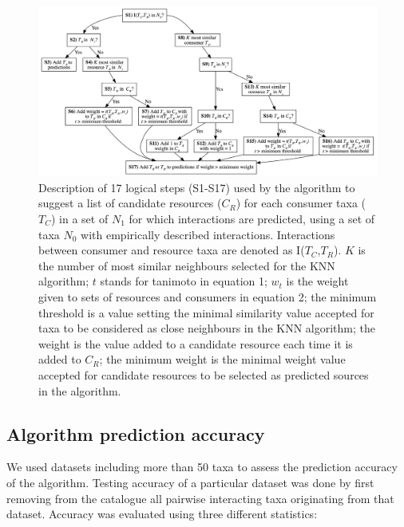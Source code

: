 \begin{figure}[H]
  \centering\includegraphics[width=\textwidth]{./figures/ch2-Decision_Diagram.png}
  \caption{Description of 17 logical steps (S1-S17) used by the algorithm to suggest a list of candidate resources ($C_R$) for each consumer taxa ($T_C$) in a set of $N_1$ for which interactions are predicted, using a set of taxa $N_0$ with empirically described interactions. Interactions between consumer and resource taxa are denoted as I($T_C$,$T_R$). $K$ is the number of most similar neighbours selected for the KNN algorithm; $t$ stands for tanimoto in equation 1; $w_t$ is the weight given to sets of resources and consumers in equation 2; the minimum threshold is a value setting the minimal similarity value accepted for taxa to be considered as close neighbours in the KNN algorithm; the weight is the value added to a candidate resource each time it is added to $C_R$; the minimum weight is the minimal weight value accepted for candidate resources to be selected as predicted sources in the algorithm.}
  \label{fig:decision_diag}
\end{figure}


\subsection{Algorithm prediction accuracy}
We used datasets including more than 50 taxa \citep{christian1999, link2002, thompson2004, brose2005, barnes2008, kortsch2015} to assess the prediction accuracy of the algorithm. Testing accuracy of a particular dataset was done by first removing from the catalogue all pairwise interacting taxa originating from that dataset. Accuracy was evaluated using three different statistics:

